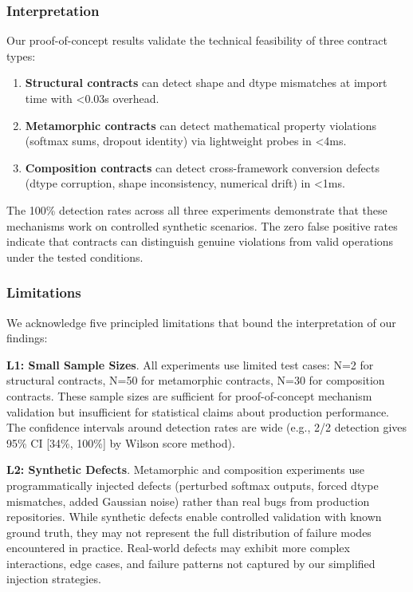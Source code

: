 
\subsubsection{Interpretation}

Our proof-of-concept results validate the technical feasibility of three contract types:

\begin{enumerate}
\item \textbf{Structural contracts} can detect shape and dtype mismatches at import time with <0.03s overhead.
\item \textbf{Metamorphic contracts} can detect mathematical property violations (softmax sums, dropout identity) via lightweight probes in <4ms.
\item \textbf{Composition contracts} can detect cross-framework conversion defects (dtype corruption, shape inconsistency, numerical drift) in <1ms.
\end{enumerate}

The 100\% detection rates across all three experiments demonstrate that these mechanisms work on controlled synthetic scenarios. The zero false positive rates indicate that contracts can distinguish genuine violations from valid operations under the tested conditions.

\subsubsection{Limitations}

We acknowledge five principled limitations that bound the interpretation of our findings:

\textbf{L1: Small Sample Sizes}. All experiments use limited test cases: N=2 for structural contracts, N=50 for metamorphic contracts, N=30 for composition contracts. These sample sizes are sufficient for proof-of-concept mechanism validation but insufficient for statistical claims about production performance. The confidence intervals around detection rates are wide (e.g., 2/2 detection gives 95\% CI [34\%, 100\%] by Wilson score method).

\textbf{L2: Synthetic Defects}. Metamorphic and composition experiments use programmatically injected defects (perturbed softmax outputs, forced dtype mismatches, added Gaussian noise) rather than real bugs from production repositories. While synthetic defects enable controlled validation with known ground truth, they may not represent the full distribution of failure modes encountered in practice. Real-world defects may exhibit more complex interactions, edge cases, and failure patterns not captured by our simplified injection strategies.

